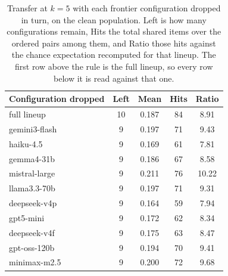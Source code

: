 \begin{table}[t]
\centering
\footnotesize
\setlength{\tabcolsep}{4pt}
\begin{tabular}{l S[table-format=2.0] S[table-format=1.3] S[table-format=3.0] S[table-format=2.2]}
\toprule
Configuration dropped & {Left} & {Mean} & {Hits} & {Ratio} \\
\midrule
full lineup & 10 & 0.187 & 84 & 8.91 \\
\midrule
gemini3-flash & 9 & 0.197 & 71 & 9.43 \\
haiku-4.5 & 9 & 0.169 & 61 & 7.81 \\
gemma4-31b & 9 & 0.186 & 67 & 8.58 \\
mistral-large & 9 & 0.211 & 76 & 10.22 \\
llama3.3-70b & 9 & 0.197 & 71 & 9.31 \\
deepseek-v4p & 9 & 0.164 & 59 & 7.94 \\
gpt5-mini & 9 & 0.172 & 62 & 8.34 \\
deepseek-v4f & 9 & 0.175 & 63 & 8.47 \\
gpt-oss-120b & 9 & 0.194 & 70 & 9.41 \\
minimax-m2.5 & 9 & 0.200 & 72 & 9.68 \\
\bottomrule
\end{tabular}
\caption{Transfer at $k = 5$ with each frontier configuration dropped in turn, on the clean population. Left is how many configurations remain, Hits the total shared items over the ordered pairs among them, and Ratio those hits against the chance expectation recomputed for that lineup. The first row above the rule is the full lineup, so every row below it is read against that one.}
\label{tab:loo}
\end{table}
